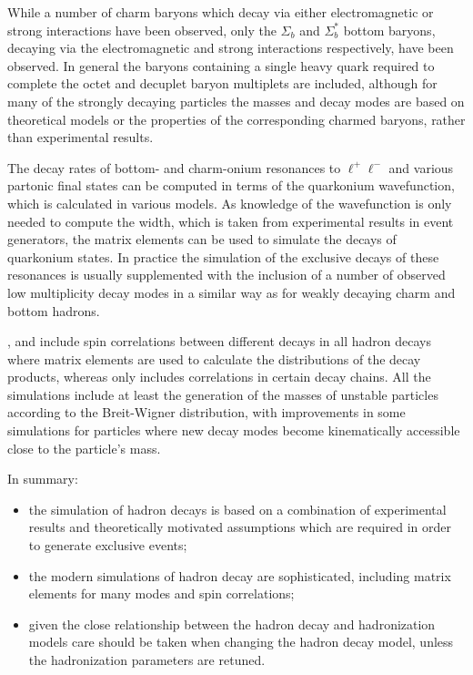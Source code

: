   While a number of charm baryons which decay via either electromagnetic or
  strong interactions have been observed, only the $\Sigma_b$ and $\Sigma_b^{*}$ bottom
  baryons, decaying via the electromagnetic and strong
  interactions respectively, have been observed.
  In general the baryons containing a single heavy quark required to 
  complete the octet and decuplet baryon multiplets are included, although
  for many of the strongly decaying particles the masses and decay modes are based
  on theoretical models or the properties of the corresponding charmed baryons,
  rather than experimental results.

  The decay rates of bottom- and charm-onium resonances to $\ell^+\ell^-$ and various
  partonic final states can be computed in terms of the quarkonium wavefunction, which 
  is calculated in various models. As knowledge of the wavefunction is only needed to
  compute the width, which is taken from experimental results in event generators, the
  matrix elements can be used to simulate the decays of quarkonium states. In practice
  the simulation of the exclusive decays of these resonances is usually supplemented
  with the inclusion of a number of observed low multiplicity decay modes in
  a similar way as for weakly decaying charm and bottom hadrons.

  \evtgen, \herwigpp and \sherpa include spin correlations between different decays
  in all hadron decays
  where matrix elements are used to calculate the distributions of the decay
  products, whereas \pythiaeight only includes correlations in certain decay chains.
  All the simulations include at least the generation of the masses of
  unstable particles according to the Breit-Wigner distribution, with improvements
  in some simulations for particles where new decay modes become kinematically
  accessible close to the particle's mass.

In summary:
\begin{itemize}
\item the simulation of hadron decays is based on a combination of
      experimental results and theoretically motivated assumptions which
      are required in order to generate exclusive events;
\item the modern simulations of hadron decay are sophisticated, including matrix elements
      for many modes and spin correlations;
\item given the close relationship between the hadron decay and hadronization models
      care should be taken when changing the hadron decay model, unless the
      hadronization parameters are retuned.
\end{itemize}

